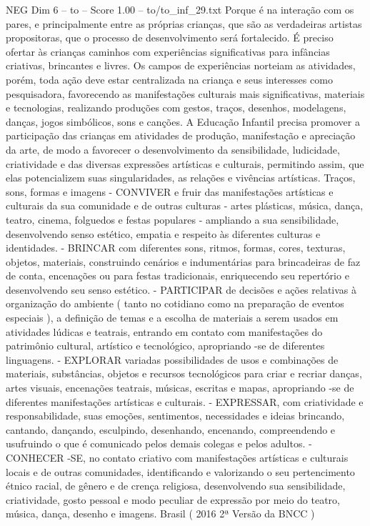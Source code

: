\begin{textsample}{NEG Dim 6 – to – Score 1.00 – to/to\_inf\_29.txt}
Porque é na interação com os pares, e principalmente entre as próprias crianças, que são as verdadeiras artistas propositoras, que o processo de desenvolvimento será fortalecido.
É preciso ofertar às crianças caminhos com experiências significativas para infâncias criativas, brincantes e livres.
Os campos de experiências norteiam as atividades, porém, toda ação deve estar centralizada na criança e seus interesses como pesquisadora, favorecendo as manifestações culturais mais significativas, materiais e tecnologias, realizando produções com gestos, traços, desenhos, modelagens, danças, jogos simbólicos, sons e canções.
A Educação Infantil precisa promover a participação das crianças em atividades de produção, manifestação e apreciação da arte, de modo a favorecer o desenvolvimento da sensibilidade, ludicidade, criatividade e das diversas expressões artísticas e culturais, permitindo assim, que elas potencializem suas singularidades, as relações e vivências artísticas.
Traços, sons, formas e imagens - CONVIVER e fruir das manifestações artísticas e culturais da sua comunidade e de outras culturas - artes plásticas, música, dança, teatro, cinema, folguedos e festas populares - ampliando a sua sensibilidade, desenvolvendo senso estético, empatia e respeito às diferentes culturas e identidades. - BRINCAR com diferentes sons, ritmos, formas, cores, texturas, objetos, materiais, construindo cenários e indumentárias para brincadeiras de faz de conta, encenações ou para festas tradicionais, enriquecendo seu repertório e desenvolvendo seu senso estético. - PARTICIPAR de decisões e ações relativas à organização do ambiente ( tanto no cotidiano como na preparação de eventos especiais ), a definição de temas e a escolha de materiais a serem usados em atividades lúdicas e teatrais, entrando em contato com manifestações do patrimônio cultural, artístico e tecnológico, apropriando -se de diferentes linguagens. - EXPLORAR variadas possibilidades de usos e combinações de materiais, substâncias, objetos e recursos tecnológicos para criar e recriar danças, artes visuais, encenações teatrais, músicas, escritas e mapas, apropriando -se de diferentes manifestações artísticas e culturais. - EXPRESSAR, com criatividade e responsabilidade, suas emoções, sentimentos, necessidades e ideias brincando, cantando, dançando, esculpindo, desenhando, encenando, compreendendo e usufruindo o que é comunicado pelos demais colegas e pelos adultos. - CONHECER -SE, no contato criativo com manifestações artísticas e culturais locais e de outras comunidades, identificando e valorizando o seu pertencimento étnico racial, de gênero e de crença religiosa, desenvolvendo sua sensibilidade, criatividade, gosto pessoal e modo peculiar de expressão por meio do teatro, música, dança, desenho e imagens.
Brasil ( 2016 2ª Versão da BNCC )

\end{textsample}
